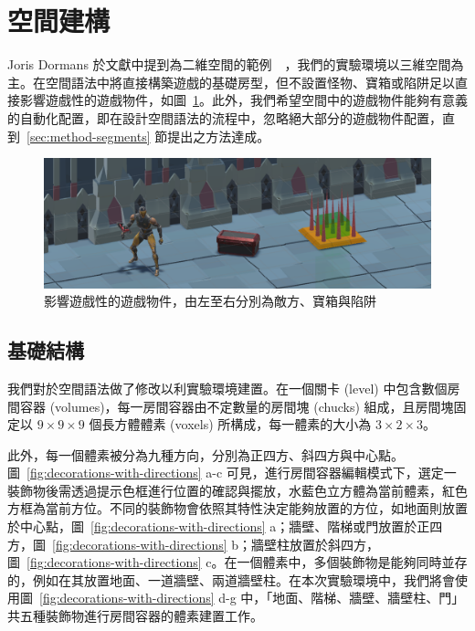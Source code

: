 \clearpage

\section{空間建構}
\label{sec:method-spacepieces}

Joris Dormans 於文獻中提到為二維空間的範例~\cite{dormans2010adventures}~\cite{dormans2012engineering}，我們的實驗環境以三維空間為主。在空間語法中將直接構築遊戲的基礎房型，但不設置怪物、寶箱或陷阱足以直接影響遊戲性的遊戲物件，如圖~\ref{fig:gameobject-list}。此外，我們希望空間中的遊戲物件能夠有意義的自動化配置，即在設計空間語法的流程中，忽略絕大部分的遊戲物件配置，直到~\ref{sec:method-segments} 節提出之方法達成。

\begin{figure}[!htb]
  \begin{center}
    \includegraphics[width=1.0\textwidth]{figures/gameobject-list.png}
    \caption{影響遊戲性的遊戲物件，由左至右分別為敵方、寶箱與陷阱} 
    \label{fig:gameobject-list}
  \end{center}
\end{figure}

\subsection{基礎結構}
\label{ssec:method-spacepieces-basic}

我們對於空間語法做了修改以利實驗環境建置。在一個關卡 (level) 中包含數個房間容器 (volumes)，每一房間容器由不定數量的房間塊 (chucks) 組成，且房間塊固定以 $9\times 9\times 9$ 個長方體體素 (voxels) 所構成，每一體素的大小為 $3\times 2\times 3$。

此外，每一個體素被分為九種方向，分別為正四方、斜四方與中心點。圖~\ref{fig:decorations-with-directions} a-c 可見，進行房間容器編輯模式下，選定一裝飾物後需透過提示色框進行位置的確認與擺放，水藍色立方體為當前體素，紅色方框為當前方位。不同的裝飾物會依照其特性決定能夠放置的方位，如地面則放置於中心點，圖~\ref{fig:decorations-with-directions} a；牆壁、階梯或門放置於正四方，圖~\ref{fig:decorations-with-directions} b；牆壁柱放置於斜四方，圖~\ref{fig:decorations-with-directions} c。在一個體素中，多個裝飾物是能夠同時並存的，例如在其放置地面、一道牆壁、兩道牆壁柱。在本次實驗環境中，我們將會使用圖~\ref{fig:decorations-with-directions} d-g 中，「地面、階梯、牆壁、牆壁柱、門」共五種裝飾物進行房間容器的體素建置工作。

